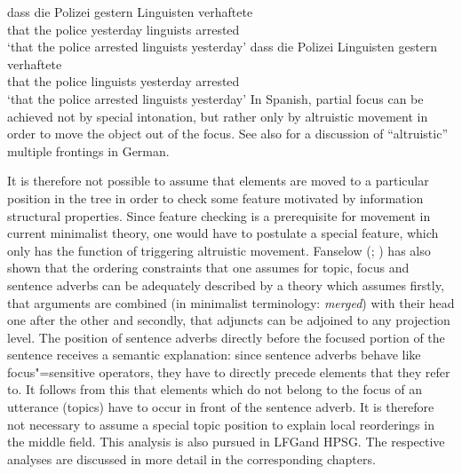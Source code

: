 \eal
\ex 
\gll dass die Polizei gestern Linguisten verhaftete\\
	 that the police yesterday linguists arrested\\
\glt `that the police arrested linguists yesterday'
\ex 
\gll dass die Polizei Linguisten gestern verhaftete\\
	 that the police linguists yesterday arrested\\
\glt `that the police arrested linguists yesterday'
\zl
%
In Spanish, partial focus can be achieved not by special intonation, but rather only by altruistic movement in order to move the
object out of the focus. See also  for a discussion of ``altruistic'' multiple frontings in German.

It is therefore not possible to assume that elements are moved to a particular position in the tree in order to check some feature motivated by
information structural properties. Since feature checking is a prerequisite for movement in current minimalist theory, one would have to postulate
a special feature, which only has the function of triggering altruistic movement. Fanselow (\citeyear[Section~4]{Fanselow2003b}; 
\citeyear[]{Fanselow2006a}) has also shown that the ordering constraints that one assumes for topic, focus and sentence adverbs can be
adequately described by a theory which assumes firstly, that arguments are combined (in minimalist terminology: 
\emph{merged}) with their head one after the other and secondly, that adjuncts can be adjoined to any projection level. The position of sentence adverbs directly before the
focused portion of the sentence receives a semantic explanation: since sentence adverbs behave like focus"=sensitive operators, they have to directly
precede elements that they refer to. It follows from this that elements which do not belong to the focus of an utterance (topics) have to occur
in front of the sentence adverb. It is therefore not necessary to assume a special topic position to explain local reorderings in the middle field.
This analysis is also pursued in LFG\indexlfg and HPSG\indexhpsg. The respective analyses are discussed in more detail in the corresponding chapters.
%


